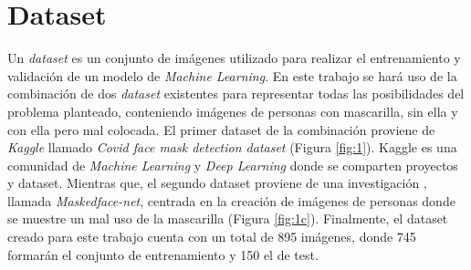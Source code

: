 \section*{Dataset} \label{dataset}

Un \textit{dataset} es un conjunto de imágenes utilizado para realizar el entrenamiento y validación de un modelo de \textit{Machine Learning}. En este trabajo se hará uso de la combinación de dos \textit{dataset} existentes para representar todas las posibilidades del problema planteado, conteniendo imágenes de personas con mascarilla, sin ella y con ella pero mal colocada. El primer dataset de la combinación proviene de \textit{Kaggle} llamado \textit{Covid face mask detection dataset} \cite{datasetMask} (Figura \ref{fig:1}). Kaggle es una comunidad de \textit{Machine Learning} y \textit{Deep Learning} donde se comparten proyectos y dataset. Mientras que, el segundo dataset proviene de una investigación \cite{Cabani_2021}, llamada \textit{Maskedface-net}, centrada en la creación de imágenes de personas donde se muestre un mal uso de la mascarilla (Figura \ref{fig:1c}). Finalmente, el dataset creado para este trabajo cuenta con un total de 895 imágenes, donde 745 formarán el conjunto de entrenamiento y 150 el de test.

